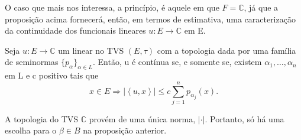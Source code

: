 \documentclass[../distribution_theory_notes.tex]{subfiles}
\begin{document}
\begin{tcolorbox}[
		skin=enhanced,
		title=Observação,
		fonttitle=\bfseries,
		colframe=black,
		colbacktitle=cyan!75!white,
		colback=cyan!15,
		colbacklower=black,
		coltitle=black,
		drop fuzzy shadow,
	]
	O caso que mais nos interessa, a princípio, é aquele em que \(F=\mathbb{C}\), já que a proposição acima fornecerá, então, em termos de estimativa, uma caracterização da continuidade dos funcionais lineares \(u:E\rightarrow \mathbb{C}\) em E.
\end{tcolorbox}

\begin{crl*}
	Seja \(u:E\rightarrow \mathbb{C}\) um linear no TVS \((E, \tau )\) com a topologia dada por uma família de seminormas \(\{p_{\alpha }\}_{\alpha\in L}.\) Então, u é contínua se, e somente se, existem \(\alpha_{1},\dotsc , \alpha_{n}\) em L e c positivo tais que
	\[
		x\in E \Rightarrow |\left< u, x \right>|\leq c\sum\limits_{j=1}^{n}p_{\alpha_{j}}(x).
	\]
\end{crl*}
\begin{proof*}
	A topologia do TVS \(\mathbb{C}\) provém de uma única norma, \(|\cdot |\). Portanto, só há uma escolha para o \(\beta \in B\) na proposição anterior. \qedsymbol
\end{proof*}
\end{document}
